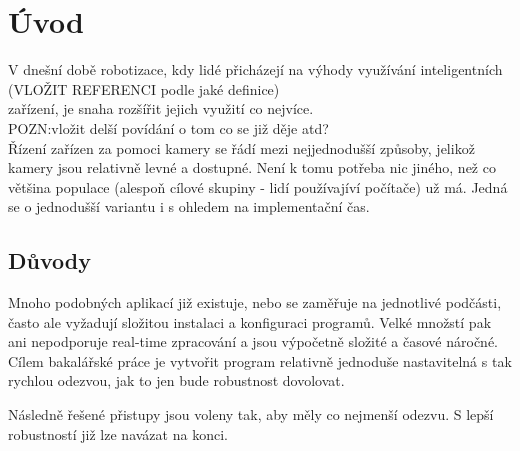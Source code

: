 \chapter{Úvod}
V dnešní době robotizace, kdy lidé přicházejí na výhody využívání inteligentních \\(VLOŽIT REFERENCI podle jaké definice)\\ zařízení, je snaha rozšířit jejich využití co nejvíce. \\POZN:vložit delší povídání o tom co se již děje atd?\\
Řízení zařízen za pomoci kamery se řádí mezi nejjednodušší způsoby, jelikož kamery jsou relativně levné a dostupné. Není k tomu potřeba nic jiného, než co většina populace (alespoň cílové skupiny - lidí používajíví počítače) už má. Jedná se o jednodušší variantu i s ohledem na implementační čas.

\section{Důvody}
Mnoho podobných aplikací již existuje, nebo se zaměřuje na jednotlivé podčásti, často ale vyžadují složitou instalaci a konfiguraci programů. Velké množstí pak ani nepodporuje real-time zpracování a jsou výpočetně složité a časové náročné. Cílem bakalářské práce je vytvořit program relativně jednoduše nastavitelná s tak rychlou odezvou, jak to jen bude robustnost dovolovat.

Následně řešené přistupy jsou voleny tak, aby měly co nejmenší odezvu. S lepší robustností již lze navázat na konci. %

\endinput